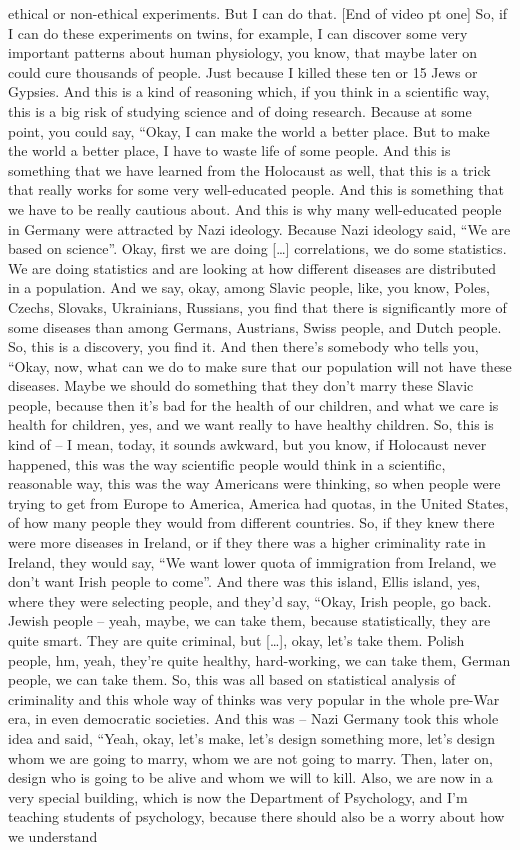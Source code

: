 ethical or non-ethical experiments. But I can do that. [End of video pt one] So, if I can do these experiments on twins, for example, I can discover some very important patterns about human physiology, you know, that maybe later on could cure thousands of people. Just because I killed these ten or 15 Jews or Gypsies. And this is a kind of reasoning which, if you think in a scientific way, this is a big risk of studying science and of doing research. Because at some point, you could say, “Okay, I can make the world a better place. But to make the world a better place, I have to waste life of some people. And this is something that we have learned from the Holocaust as well, that this is a trick that really works for some very well-educated people. And this is something that we have to be really cautious about. And this is why many well-educated people in Germany were attracted by Nazi ideology. Because Nazi ideology said, “We are based on science”. Okay, first we are doing […] correlations, we do some statistics. We are doing statistics and are looking at how different diseases are distributed in a population. And we say, okay, among Slavic people, like, you know, Poles, Czechs, Slovaks, Ukrainians, Russians, you find that there is significantly more of some diseases than among Germans, Austrians, Swiss people, and Dutch people. So, this is a discovery, you find it. And then there’s somebody who tells you, “Okay, now, what can we do to make sure that our population will not have these diseases. Maybe we should do something that they don’t marry these Slavic people, because then it’s bad for the health of our children, and what we care is health for children, yes, and we want really to have healthy children. So, this is kind of – I mean, today, it sounds awkward, but you know, if Holocaust never happened, this was the way scientific people would think in a scientific, reasonable way, this was the way Americans were thinking, so when people were trying to get from Europe to America, America had quotas, in the United States, of how many people they would from different countries. So, if they knew there were more diseases in Ireland, or if they there was a higher criminality rate in Ireland, they would say, “We want lower quota of immigration from Ireland, we don’t want Irish people to come”. And there was this island, Ellis island, yes, where they were selecting people, and they’d say, “Okay, Irish people, go back. Jewish people – yeah, maybe, we can take them, because statistically, they are quite smart. They are quite criminal, but […], okay, let’s take them. Polish people, hm, yeah, they’re quite healthy, hard-working, we can take them, German people, we can take them. So, this was all based on statistical analysis of criminality and this whole way of thinks was very popular in the whole pre-War era, in even democratic societies. And this was – Nazi Germany took this whole idea and said, “Yeah, okay, let’s make, let’s design something more, let’s design whom we are going to marry, whom we are not going to marry. Then, later on, design who is going to be alive and whom we will to kill. Also, we are now in a very special building, which is now the Department of Psychology, and I’m teaching students of psychology, because there should also be a worry about how we understand 